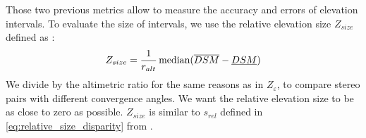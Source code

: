 Those two previous metrics allow to measure the accuracy and errors of elevation intervals. To evaluate the size of intervals, we use the relative elevation size $Z_{size}$ defined as :
\begin{align}\label{eq:relative_size_elevation}
    Z_{size} = \dfrac{1}{r_{alt}}\operatorname*{median}(\overline{DSM}-\underline{DSM})
\end{align}
We divide by the altimetric ratio for the same reasons as in $Z_\varepsilon$, \ie to compare stereo pairs with different convergence angles. We want the relative elevation size to be as close to zero as possible. $Z_{size}$ is similar to $s_{rel}$ defined in \cref{eq:relative_size_disparity} from .

